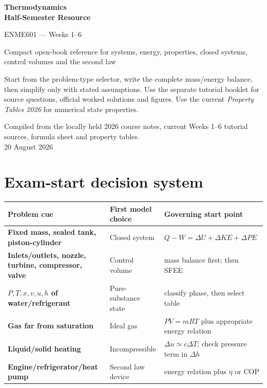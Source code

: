 \documentclass[9pt,a4paper]{extarticle}
\begin{document}
\begin{titlepage}
\centering\vspace*{25mm}
{\Huge\bfseries Thermodynamics\\Half-Semester Resource\par}\vspace{5mm}
{\Large ENME601 --- Weeks 1--6\par}\vspace{12mm}
{\large Compact open-book reference for systems, energy, properties, closed systems, control volumes and the second law\par}
\vfill
\begin{quick}
Start from the problem-type selector, write the complete mass/energy balance, then simplify only with stated assumptions. Use the separate tutorial booklet for source questions, official worked solutions and figures. Use the current \textit{Property Tables 2026} for numerical state properties.
\end{quick}
\vfill
{Compiled from the locally held 2026 course notes, current Weeks 1--6 tutorial sources, formula sheet and property tables.\\20 August 2026}
\end{titlepage}
\tableofcontents\newpage

\section{Exam-start decision system}
\begin{tabularx}{\textwidth}{>{\bfseries}p{}X X}
\toprule
Problem cue & First model choice & Governing start point\\\midrule
Fixed mass, sealed tank, piston-cylinder & Closed system & $Q-W=\Delta U+\Delta KE+\Delta PE$\\
Inlets/outlets, nozzle, turbine, compressor, valve & Control volume & mass balance first; then SFEE\\
$P,T,x,v,u,h$ of water/refrigerant & Pure-substance state & classify phase, then select table\\
Gas far from saturation & Ideal gas & $PV=mRT$ plus appropriate energy relation\\
Liquid/solid heating & Incompressible & $\Delta u\simeq c\Delta T$; check pressure term in $\Delta h$\\
Engine/refrigerator/heat pump & Second law device & energy relation plus $\eta$ or COP\\\bottomrule
\end{tabularx}
\end{document}
